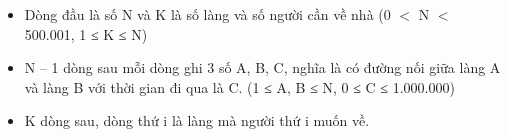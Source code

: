 \begin{itemize}
	\item     Dòng đầu là số N và K là số làng và số người cần về nhà (0 $<$ N $<$ 500.001, 1 ≤ K ≤ N)   
	\item     N – 1 dòng sau mỗi dòng ghi 3 số A, B, C, nghĩa là có đường nối giữa làng A và làng B với thời gian đi qua là C. (1 ≤ A, B ≤ N, 0 ≤ C ≤ 1.000.000)   
	\item     K dòng sau, dòng thứ i là làng mà người thứ i muốn về.   
\end{itemize}